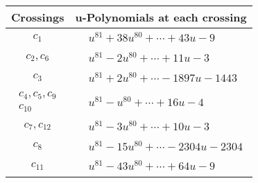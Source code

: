 \documentclass[1p]{elsarticle_modified}
\theoremstyle{definition}
\begin{document}
\begin{tabular}{m{50pt}|m{274pt}}
Crossings & \hspace{64pt}u-Polynomials at each crossing \\
\hline $$\begin{aligned}c_{1}\end{aligned}$$&$\begin{aligned}
&u^{81}+38 u^{80}+\cdots+43 u-9
\end{aligned}$\\
\hline $$\begin{aligned}c_{2},c_{6}\end{aligned}$$&$\begin{aligned}
&u^{81}-2 u^{80}+\cdots+11 u-3
\end{aligned}$\\
\hline $$\begin{aligned}c_{3}\end{aligned}$$&$\begin{aligned}
&u^{81}+2 u^{80}+\cdots-1897 u-1443
\end{aligned}$\\
\hline $$\begin{aligned}c_{4},c_{5},c_{9}\\c_{10}\end{aligned}$$&$\begin{aligned}
&u^{81}- u^{80}+\cdots+16 u-4
\end{aligned}$\\
\hline $$\begin{aligned}c_{7},c_{12}\end{aligned}$$&$\begin{aligned}
&u^{81}-3 u^{80}+\cdots+10 u-3
\end{aligned}$\\
\hline $$\begin{aligned}c_{8}\end{aligned}$$&$\begin{aligned}
&u^{81}-15 u^{80}+\cdots-2304 u-2304
\end{aligned}$\\
\hline $$\begin{aligned}c_{11}\end{aligned}$$&$\begin{aligned}
&u^{81}-43 u^{80}+\cdots+64 u-9
\end{aligned}$\\
\hline
\end{tabular}\\~\\
\end{document}
